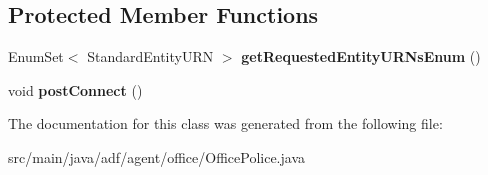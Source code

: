 \subsection*{Protected Member Functions}
\begin{DoxyCompactItemize}
\item 
\hypertarget{classadf_1_1agent_1_1office_1_1OfficePolice_ad5bc7fbdbb914c8d69d925b4b2e7ab35}{}\label{classadf_1_1agent_1_1office_1_1OfficePolice_ad5bc7fbdbb914c8d69d925b4b2e7ab35} 
Enum\+Set$<$ Standard\+Entity\+U\+RN $>$ {\bfseries get\+Requested\+Entity\+U\+R\+Ns\+Enum} ()
\item 
\hypertarget{classadf_1_1agent_1_1office_1_1OfficePolice_a350d6cfe44a08e7b57ed818725ff9cb0}{}\label{classadf_1_1agent_1_1office_1_1OfficePolice_a350d6cfe44a08e7b57ed818725ff9cb0} 
void {\bfseries post\+Connect} ()
\end{DoxyCompactItemize}


The documentation for this class was generated from the following file\+:\begin{DoxyCompactItemize}
\item 
src/main/java/adf/agent/office/Office\+Police.\+java\end{DoxyCompactItemize}
